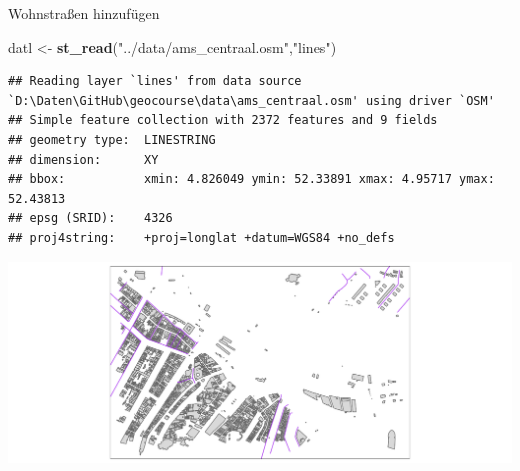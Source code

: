 \documentclass[ignorenonframetext,]{beamer}
\newenvironment{Shaded}{\begin{snugshade}}{\end{snugshade}}
\newcommand{\KeywordTok}[1]{\textcolor[rgb]{0.13,0.29,0.53}{\textbf{#1}}}
\newcommand{\DataTypeTok}[1]{\textcolor[rgb]{0.13,0.29,0.53}{#1}}
\newcommand{\StringTok}[1]{\textcolor[rgb]{0.31,0.60,0.02}{#1}}
\newcommand{\OperatorTok}[1]{\textcolor[rgb]{0.81,0.36,0.00}{\textbf{#1}}}
\newcommand{\NormalTok}[1]{#1}
\begin{document}
\begin{frame}[fragile]{Wohnstraßen hinzufügen}

\begin{Shaded}
\begin{Highlighting}[]
\NormalTok{datl <-}\StringTok{ }\KeywordTok{st_read}\NormalTok{(}\StringTok{"../data/ams_centraal.osm"}\NormalTok{,}\StringTok{"lines"}\NormalTok{)}
\end{Highlighting}
\end{Shaded}

\begin{verbatim}
## Reading layer `lines' from data source `D:\Daten\GitHub\geocourse\data\ams_centraal.osm' using driver `OSM'
## Simple feature collection with 2372 features and 9 fields
## geometry type:  LINESTRING
## dimension:      XY
## bbox:           xmin: 4.826049 ymin: 52.33891 xmax: 4.95717 ymax: 52.43813
## epsg (SRID):    4326
## proj4string:    +proj=longlat +datum=WGS84 +no_defs
\end{verbatim}

\begin{Shaded}
\end{Shaded}

\includegraphics{simplefeatures_files/figure-beamer/unnamed-chunk-29-1.pdf}

\end{frame}
\end{document}
